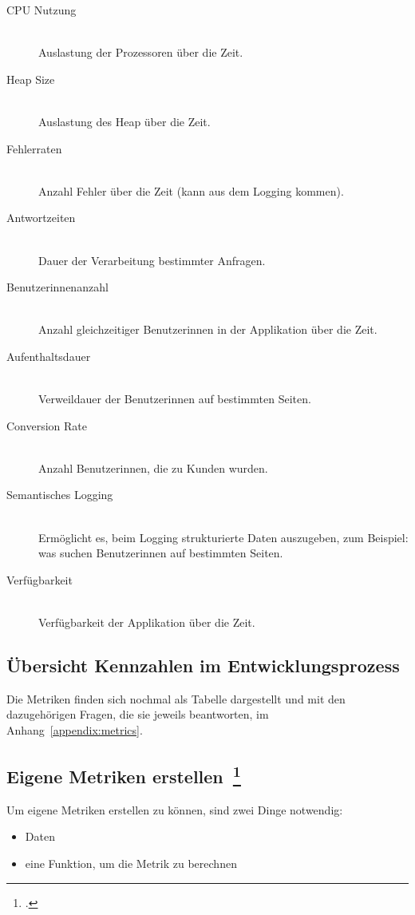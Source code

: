 \begin{description}
  \item[CPU Nutzung] \hfill \\ Auslastung der Prozessoren über die Zeit.
  \item[Heap Size] \hfill \\ Auslastung des Heap über die Zeit.
  \item[Fehlerraten] \hfill \\ Anzahl Fehler über die Zeit (kann aus dem Logging kommen).
  \item[Antwortzeiten] \hfill \\ Dauer der Verarbeitung bestimmter Anfragen.
  \item[Benutzerinnenanzahl] \hfill \\ Anzahl gleichzeitiger Benutzerinnen in der Applikation über die Zeit.
  \item[Aufenthaltsdauer] \hfill \\ Verweildauer der Benutzerinnen auf bestimmten Seiten.
  \item[Conversion Rate] \hfill \\ Anzahl Benutzerinnen, die zu Kunden wurden.
  \item[Semantisches Logging] \hfill \\ Ermöglicht es, beim Logging strukturierte Daten auszugeben, zum Beispiel: was suchen Benutzerinnen auf bestimmten Seiten.
  \item[Verfügbarkeit] \hfill \\ Verfügbarkeit der Applikation über die Zeit.
\end{description}

\subsection{Übersicht Kennzahlen im Entwicklungsprozess}

Die Metriken finden sich nochmal als Tabelle dargestellt und mit den dazugehörigen Fragen, die sie jeweils beantworten, im Anhang~\ref{appendix:metrics}.

\clearpage
\subsection[Eigene Metriken erstellen]{Eigene Metriken erstellen~\footcite[vgl.][S.127ff]{davis_agile_2015}}

Um eigene Metriken erstellen zu können, sind zwei Dinge notwendig:
\begin{itemize}
  \item Daten
  \item eine Funktion, um die Metrik zu berechnen
\end{itemize}

